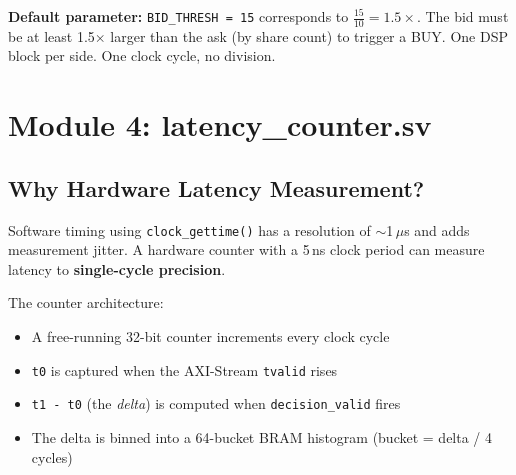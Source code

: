 \documentclass[11pt,a4paper]{article}
\begin{document}
\begin{center}
\end{center}

\noindent\textbf{Default parameter:} \texttt{BID\_THRESH = 15} corresponds to
$\frac{15}{10} = 1.5\times$. The bid must be at least 1.5$\times$ larger than
the ask (by share count) to trigger a BUY. One DSP block per side.
One clock cycle, no division.

\section{Module 4: latency\_counter.sv}

\subsection{Why Hardware Latency Measurement?}

Software timing using \texttt{clock\_gettime()} has a resolution of
$\sim$1\,$\mu$s and adds measurement jitter. A hardware counter with a 5\,ns
clock period can measure latency to \textbf{single-cycle precision}.

The counter architecture:
\begin{itemize}
  \item A free-running 32-bit counter increments every clock cycle
  \item \texttt{t0} is captured when the AXI-Stream \texttt{tvalid} rises
  \item \texttt{t1 - t0} (the \emph{delta}) is computed when \texttt{decision\_valid} fires
  \item The delta is binned into a 64-bucket BRAM histogram (bucket = delta / 4 cycles)
\end{itemize}
\end{document}
